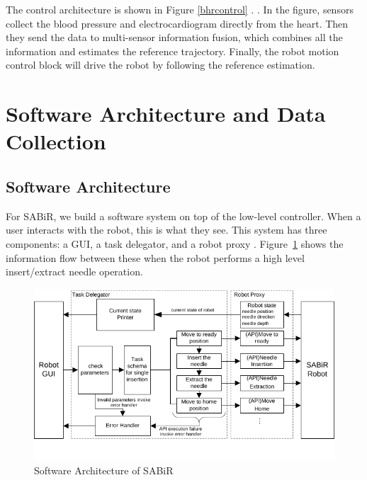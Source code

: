 The control architecture is shown in Figure \ref{bhrcontrol} \cite{bebek2007whisker, tuna2013heart}. . In the figure, sensors collect the blood pressure and electrocardiogram directly from the heart. Then they send the data to multi-sensor information fusion, which combines all the information and estimates the reference trajectory. Finally, the robot motion control block will drive the robot by following the reference estimation.

\section{Software Architecture and Data Collection}\label{softwareframe}

\subsection{Software Architecture}
For SABiR, we build a software system on top of the low-level controller. When a user interacts with the robot, this is what they see.  This system has three components: a GUI, a task delegator, and a robot proxy \cite{liangframework}. Figure~\ref{sabirsw} shows the information flow between these when the robot performs a high level insert/extract needle operation.

\begin{figure}[!thpb]
\centering
\includegraphics[width=\textwidth]{chapter5_SABiRsw.pdf}
\caption{Software Architecture of SABiR}
\label{sabirsw}
\end{figure}

